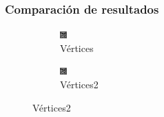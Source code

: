 \documentclass[11pt]{beamer}
\begin{document}
\begin{frame}
\frametitle{Comparación de resultados}

\begin{figure}[H]
    \centering
    \begin{subfigure}[h]{0.3\textwidth} 
        \includegraphics[width=\textwidth]{img/tomovertices.png}
        \caption{Vértices}
        \label{fig:vertices}
    \end{subfigure}
    \begin{subfigure}[h]{0.3\textwidth} 
        \includegraphics[width=\textwidth]{img/tomovertices.png}
        \caption{Vértices2}
        \label{fig:vertices2}
    \end{subfigure}



\end{figure}
\end{frame}
\end{document}
